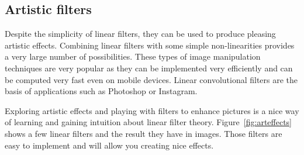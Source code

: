 





\subsection{Artistic filters}

Despite the simplicity of linear filters, they can be used to produce pleasing artistic effects. Combining linear filters with some simple non-linearities provides a very large number of possibilities. These types of image manipulation techniques are very popular as they can be implemented very efficiently and can be computed very fast even on mobile devices. Linear convolutional filters are the basis of applications such as Photoshop or Instagram.

Exploring artistic effects and playing with filters to enhance pictures is a nice way of learning and gaining intuition about linear filter theory. Figure~\ref{fig:arteffects} shows a few linear filters and the result they have in images. Those filters are easy to implement and will allow you creating nice effects.

